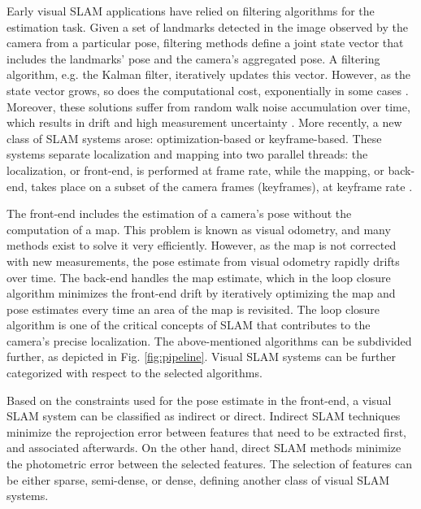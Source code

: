 Early visual \ac{SLAM} applications have relied on filtering algorithms for the estimation task. Given a set of landmarks detected in the image observed by the camera from a particular pose, filtering methods define a joint state vector that includes the landmarks' pose and the camera's aggregated pose. 
A filtering algorithm, e.g. the Kalman filter, iteratively updates this vector. However, as the state vector grows, so does the computational cost, exponentially in some cases \cite{intro:ito2000gaussian}. Moreover, these solutions suffer from random walk noise accumulation over time, which results in drift and high measurement uncertainty \cite{intro:survey:aulinas2008filterslam}.
More recently, a new class of SLAM systems arose: optimization-based or keyframe-based. These systems separate localization and mapping into two parallel threads: the localization, or front-end, is performed at frame rate, while the mapping, or back-end, takes place on a subset of the camera frames (keyframes), at keyframe rate \cite{intro:survey:younes2017keyframe}. 

The front-end includes the estimation of a camera's pose without the computation of a map. This problem is known as visual odometry, and many methods exist to solve it very efficiently. However, as the map is not corrected with new measurements, the pose estimate from visual odometry rapidly drifts over time. 
The back-end handles the map estimate, which in the loop closure algorithm minimizes the front-end drift by iteratively optimizing the map and pose estimates every time an area of the map is revisited. The loop closure algorithm is one of the critical concepts of \ac{SLAM}  that contributes to the camera's precise localization.
The above-mentioned algorithms can be subdivided further, as depicted in Fig. \ref{fig:pipeline}. Visual \ac{SLAM} systems can be further categorized with respect to the selected algorithms.  

Based on the constraints used for the pose estimate in the front-end, a visual \ac{SLAM} system can be classified as indirect or direct.
Indirect \ac{SLAM} techniques minimize the reprojection error between features that need to be extracted first, and associated afterwards. On the other hand, direct \ac{SLAM} methods minimize the photometric error between the selected features. The selection of features can be either sparse, semi-dense, or dense, defining another class of visual \ac{SLAM} systems. 


